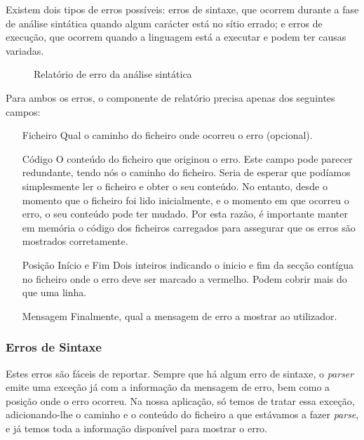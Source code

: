 Existem dois tipos de erros possíveis: erros de sintaxe, que ocorrem durante a fase de análise sintática quando algum carácter está no sítio errado; e erros de execução, que ocorrem quando a linguagem está a executar e podem ter causas variadas.

\begin{figure}[ht]
  \centering
  {%
  \setlength{\fboxsep}{0pt}%
  \setlength{\fboxrule}{0pt}%
  }%
  \caption{Relatório de erro da análise sintática}
  \label{fig:error_reporting_parse}
\end{figure}

Para ambos os erros, o componente de relatório precisa apenas dos seguintes campos:
\begin{enumerate}
 \item[Ficheiro] Qual o caminho do ficheiro onde ocorreu o erro (opcional).
 \item[Código] O conteúdo do ficheiro que originou o erro. Este campo pode parecer redundante, tendo nós o caminho do ficheiro. Seria de esperar que podíamos simplesmente ler o ficheiro e obter o seu conteúdo. No entanto, desde o momento que o ficheiro foi lido inicialmente, e o momento em que ocorreu o erro, o seu conteúdo pode ter mudado. Por esta razão, é importante manter em memória o código dos ficheiros carregados para assegurar que os erros são mostrados corretamente.
 \item[Posição Início e Fim] Dois inteiros indicando o inicio e fim da secção contígua no ficheiro onde o erro deve ser marcado a vermelho. Podem cobrir mais do que uma linha.
 \item[Mensagem] Finalmente, qual a mensagem de erro a mostrar ao utilizador.
\end{enumerate}

\subsubsection*{Erros de Sintaxe}
Estes erros são fáceis de reportar. Sempre que há algum erro de sintaxe, o \textit{parser} emite uma exceção já com a informação da mensagem de erro, bem como a posição onde o erro ocorreu. Na nossa aplicação, só temos de tratar essa exceção, adicionando-lhe o caminho e o conteúdo do ficheiro a que estávamos a fazer \textit{parse}, e já temos toda a informação disponível para mostrar o erro.

